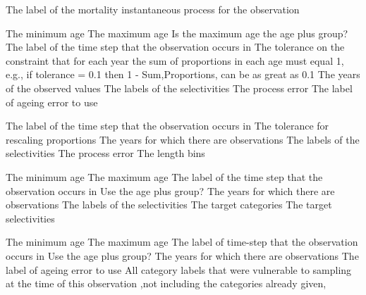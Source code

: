  {The label of the mortality instantaneous process for the observation}
\par\textbf{}\par
{} {The minimum age}
 {The maximum age}
 {Is the maximum age the age plus group?}
 {The label of the time step that the observation occurs in}
 {The tolerance on the constraint that for each year the sum of proportions in each age must equal 1, e.g., if tolerance = 0.1 then 1 - Sum,Proportions, can be as great as 0.1}
 {The years of the observed values}
 {The labels of the selectivities}
 {The process error}
 {The label of ageing error to use}
\par\textbf{}\par
{} {The label of the time step that the observation occurs in}
 {The tolerance for rescaling proportions}
 {The years for which there are observations}
 {The labels of the selectivities}
 {The process error}
 {The length bins}
\par\textbf{}\par
{} {The minimum age}
 {The maximum age}
 {The label of the time step that the observation occurs in}
 {Use the age plus group?}
 {The years for which there are observations}
 {The labels of the selectivities}
 {The target categories}
 {The target selectivities}
\par\textbf{}\par
{} {The minimum age}
 {The maximum age}
 {The label of time-step that the observation occurs in}
 {Use the age plus group?}
 {The years for which there are observations}
 {The label of ageing error to use}
 {All category labels that were vulnerable to sampling at the time of this observation ,not including the categories already given,}
